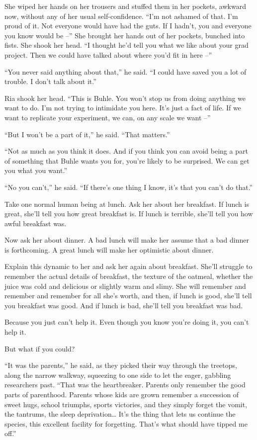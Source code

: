She wiped her hands on her trousers and stuffed them in her pockets, 
awkward now, without any of her usual self-confidence. “I'm not 
ashamed of that. I'm proud of it. Not everyone would have had the guts. 
If I hadn't, you and everyone you know would be --” She brought her 
hands out of her pockets, bunched into fists. She shook her head. “I 
thought he'd tell you what we like about your grad project. Then we 
could have talked about where you'd fit in here --”

“You never said anything about that,” he said. “I could have 
saved you a lot of trouble. I don't talk about it.”

Ria shook her head. “This is Buhle. You won't stop us from doing 
anything we want to do. I'm not trying to intimidate you here. It's 
just a fact of life. If we want to replicate your experiment, we can, 
on any scale we want --”

“But I won't be a part of it,” he said. “That matters.”

“Not as much as you think it does. And if you think you can avoid 
being a part of something that Buhle wants you for, you're likely to be 
surprised. We can get you what you want.”

“No you can't,” he said. “If there's one thing I know, it's that 
you can't do that.”

\tb

Take one normal human being at lunch. Ask her about her breakfast. If 
lunch is great, she'll tell you how great breakfast is. If lunch is 
terrible, she'll tell you how awful breakfast was.

Now ask her about dinner. A bad lunch will make her assume that a bad 
dinner is forthcoming. A great lunch will make her optimistic about 
dinner.

Explain this dynamic to her and ask her again about breakfast. She'll 
struggle to remember the actual details of breakfast, the texture of 
the oatmeal, whether the juice was cold and delicious or slightly warm 
and slimy. She will remember and remember and remember for all she's 
worth, and then, if lunch is good, she'll tell you breakfast was good. 
And if lunch is bad, she'll tell you breakfast was bad.

Because you just can't help it. Even though you know you're doing it, 
you can't help it.

But what if you could?

\tb

“It was the parents,” he said, as they picked their way through the 
treetops, along the narrow walkway, squeezing to one side to let the 
eager, gabbling researchers past. “That was the heartbreaker. Parents 
only remember the good parts of parenthood. Parents whose kids are 
grown remember a succession of sweet hugs, school triumphs, sports 
victories, and they simply forget the vomit, the tantrums, the sleep 
deprivation\ldots{} It's the thing that lets us continue the species, this 
excellent facility for forgetting. That's what should have tipped me 
off.”

